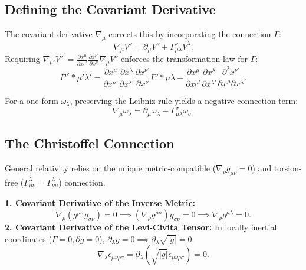 \documentclass[11pt, a4paper]{report}
\begin{document}
\subsection*{Defining the Covariant Derivative}
The covariant derivative $\nabla_\mu$ corrects this by incorporating the connection $\Gamma$:
\begin{equation}\label{eq:cov_deriv_vector}
\nabla_\mu V^\nu = \partial_\mu V^\nu + \Gamma^\nu_{\mu\lambda} V^\lambda.
\end{equation}
Requiring $\nabla_{\mu'} V^{\nu'} = \frac{\partial x^\mu}{\partial x^{\mu'}} \frac{\partial x^{\nu'}}{\partial x^\nu} \nabla_\mu V^\nu$ enforces the transformation law for $\Gamma$:
\begin{equation}\label{eq:gamma_transformation}
\Gamma^{\nu'}*{\mu'\lambda'} = \frac{\partial x^\mu}{\partial x^{\mu'}} \frac{\partial x^\lambda}{\partial x^{\lambda'}} \frac{\partial x^{\nu'}}{\partial x^\nu} \Gamma^\nu*{\mu\lambda} - \frac{\partial x^\mu}{\partial x^{\mu'}} \frac{\partial x^{\lambda}}{\partial x^{\lambda'}} \frac{\partial^2 x^{\nu'}}{\partial x^\mu \partial x^\lambda}.
\end{equation}

For a one-form $\omega_\lambda$, preserving the Leibniz rule yields a negative connection term:
\begin{equation}
\nabla_\mu \omega_\lambda = \partial_\mu \omega_\lambda - \Gamma^\sigma_{\mu\lambda} \omega_\sigma.
\end{equation}

\subsection*{The Christoffel Connection}
General relativity relies on the unique metric-compatible ($\nabla_\rho g_{\mu\nu} = 0$) and torsion-free ($\Gamma^\lambda_{\mu\nu} = \Gamma^\lambda_{\nu\mu}$) connection.

\textbf{1. Covariant Derivative of the Inverse Metric:}
\begin{equation}
\nabla_\rho (g^{\mu\sigma} g_{\sigma\nu}) = 0 \implies (\nabla_\rho g^{\mu\sigma}) g_{\sigma\nu} = 0 \implies \nabla_\rho g^{\mu\lambda} = 0.
\end{equation}
\textbf{2. Covariant Derivative of the Levi-Civita Tensor:}
In locally inertial coordinates ($\Gamma = 0, \partial g = 0$), $\partial_\lambda g = 0 \implies \partial_\lambda \sqrt{|g|} = 0$.
\begin{equation}
\nabla_\lambda \epsilon_{\mu\nu\rho\sigma} = \partial_\lambda (\sqrt{|g|} \tilde{\epsilon}_{\mu\nu\rho\sigma}) = 0.
\end{equation}
\end{document}
